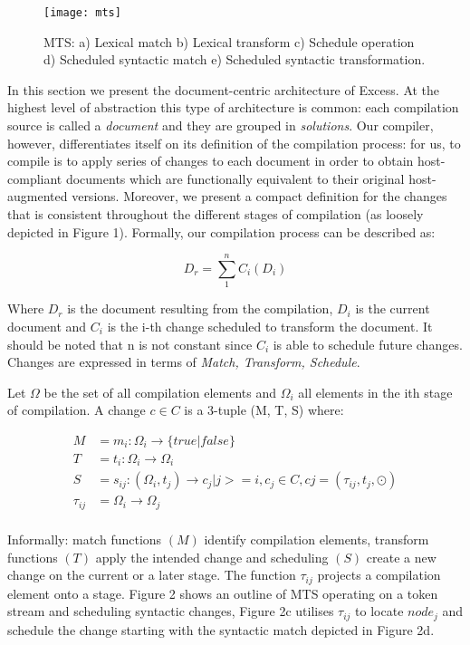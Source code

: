 \documentclass[conference]{IEEEtran}
\begin{document}
\begin{figure*}
  \texttt{[image: mts]}
  \caption{MTS: a) Lexical match b) Lexical transform c) Schedule operation d) Scheduled syntactic match e) Scheduled syntactic transformation.}
\end{figure*}

In this section we present the document-centric architecture of Excess. At the highest level of abstraction this type of architecture is common: each compilation source is called a \textit{document} and they are grouped in \textit{solutions}. 
Our compiler, however, differentiates itself on its definition of the compilation process: for us, to compile is to apply series of changes to each document in order to obtain host-compliant documents which are functionally equivalent to their original host-augmented versions. 
Moreover, we present a compact definition for the changes that is consistent throughout the different stages of compilation (as loosely depicted in Figure 1). Formally, our compilation process can be described as:

	\begin{equation}D_{r} = \sum_{1}^{n} C_{i}(D_{i})\end{equation}

Where $D_{r}$ is the document resulting from the compilation, $D_{i}$ is the current document and $C_{i}$ is the i-th change scheduled to transform the document. It should be noted that n is not constant since $C_{i}$ is able to schedule future changes. 
Changes are expressed in terms of \textit{Match, Transform, Schedule}. 

Let $\Omega$ be the set of all compilation elements and $\Omega_{i}$ all elements in the ith stage of compilation. A change $c \in C$ is a 3-tuple (M, T, S) where:

\begin{align*}
	M &= m_{i}: \Omega_{i} \rightarrow \{true|false\} \\
	T &= t_{i}: \Omega_{i} \rightarrow \Omega_{i} \\
	S &= s_{ij}: (\Omega_{i}, t_{j}) \rightarrow c_{j} | j >= i, c_{j}\in C,  cj =(\tau_{ij}, t_{j}, \odot)\\
          \tau_{ij} &= \Omega_{i} \rightarrow \Omega_{j} \\
\end{align*}

Informally: match functions $(M)$ identify compilation elements, transform functions $(T)$ apply the intended change and scheduling $(S)$ create a new change on the current or a later stage. 
The function $\tau_{ij}$ projects a compilation element onto a stage. Figure 2 shows an outline of MTS operating on a token stream and scheduling syntactic changes, Figure 2c utilises $\tau_{ij}$ to locate $node_{j}$ and schedule 
the change starting with the syntactic match depicted in Figure 2d.
\end{document}
